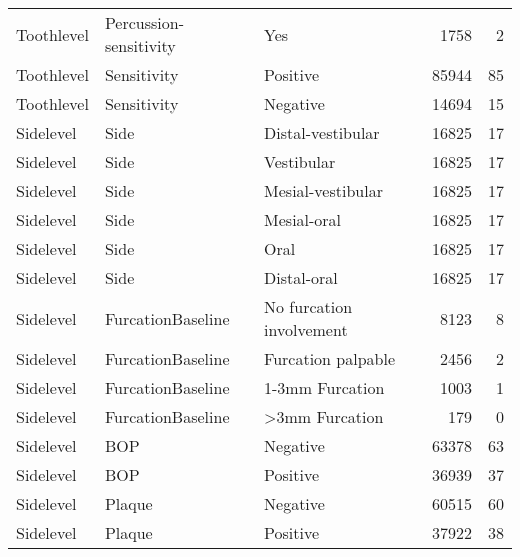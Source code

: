 \begin{tabular}{lllrr}
Toothlevel & Percussion-sensitivity & Yes & 1758 & 2 \\
Toothlevel & Sensitivity & Positive & 85944 & 85 \\
Toothlevel & Sensitivity & Negative & 14694 & 15 \\
Sidelevel & Side & Distal-vestibular & 16825 & 17 \\
Sidelevel & Side & Vestibular & 16825 & 17 \\
Sidelevel & Side & Mesial-vestibular & 16825 & 17 \\
Sidelevel & Side & Mesial-oral & 16825 & 17 \\
Sidelevel & Side & Oral & 16825 & 17 \\
Sidelevel & Side & Distal-oral & 16825 & 17 \\
Sidelevel & FurcationBaseline & No furcation involvement & 8123 & 8 \\
Sidelevel & FurcationBaseline & Furcation palpable & 2456 & 2 \\
Sidelevel & FurcationBaseline & 1-3mm Furcation & 1003 & 1 \\
Sidelevel & FurcationBaseline & >3mm Furcation & 179 & 0 \\
Sidelevel & BOP & Negative & 63378 & 63 \\
Sidelevel & BOP & Positive & 36939 & 37 \\
Sidelevel & Plaque & Negative & 60515 & 60 \\
Sidelevel & Plaque & Positive & 37922 & 38 \\
\bottomrule
\end{tabular}
